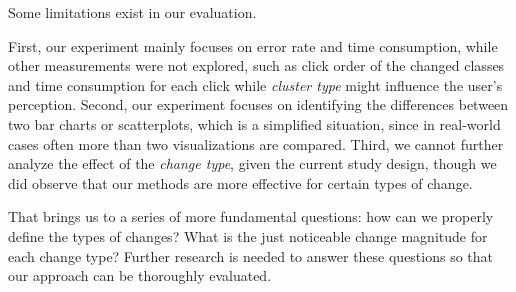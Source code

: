 Some limitations exist in our evaluation.

First, our experiment mainly focuses on error rate and time consumption, while other measurements were not explored, such as click order of the changed classes and time consumption for each click while \emph{cluster type} might influence the user's perception.
Second, our experiment focuses on identifying the differences between two bar charts or scatterplots, which is a simplified situation, since in real-world cases often more than two visualizations are compared.
Third, we cannot further analyze the effect of the \emph{change type}, given the current study design, though we did observe that our methods are more effective for certain types of change.

That brings us to a series of more fundamental questions: how can we properly define the types of changes? What is the just noticeable change magnitude for each change type?
Further research is needed to answer these questions so that our approach can be thoroughly evaluated.
